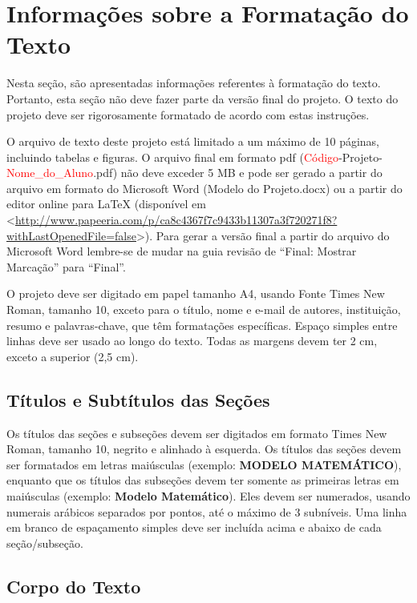 \documentclass[%
  report,%
  10pt,%
  a4paper,%
  fleqn,%
  oneside,%
  sumario = tradicional,%
  chapter = TITLE,%
  section = TITLE,%
]{abntex2}
\begin{document}
\section{Informações sobre a Formatação do Texto}\label{sec:infoform}

Nesta seção, são apresentadas informações referentes à formatação do texto. Portanto, esta seção não deve fazer parte da versão final do projeto. O texto do projeto deve ser rigorosamente formatado de acordo com estas instruções.

O arquivo de texto deste projeto está limitado a um máximo de 10 páginas, incluindo tabelas e figuras. O arquivo final em formato pdf (\textcolor{red}{Código}-Projeto-\textcolor{red}{Nome\_do\_Aluno}.pdf) não deve exceder 5 MB e pode ser gerado a partir do arquivo em formato do Microsoft Word (Modelo do Projeto.docx) ou a partir do editor online para LaTeX (disponível em <\url{http://www.papeeria.com/p/ca8c4367f7c9433b11307a3f720271f8?withLastOpenedFile=false}>). Para gerar a versão final a partir do arquivo do Microsoft Word lembre-se de mudar na guia revisão de ``Final: Mostrar Marcação'' para ``Final''.

O projeto deve ser digitado em papel tamanho A4, usando Fonte Times New Roman, tamanho 10, exceto para o título, nome e e-mail de autores, instituição, resumo e palavras-chave, que têm formatações específicas. Espaço simples entre linhas deve ser usado ao longo do texto. Todas as margens devem ter 2 cm, exceto a superior (2,5 cm).

\subsection{Títulos e Subtítulos das Seções}\label{ssec:tit}

Os títulos das seções e subseções devem ser digitados em formato Times New Roman, tamanho 10, negrito e alinhado à esquerda. Os títulos das seções devem ser formatados em letras maiúsculas (exemplo: \textbf{MODELO MATEMÁTICO}), enquanto que os títulos das subseções devem ter somente as primeiras letras em maiúsculas (exemplo: \textbf{Modelo Matemático}). Eles devem ser numerados, usando numerais arábicos separados por pontos, até o máximo de 3 subníveis. Uma linha em branco de espaçamento simples deve ser incluída acima e abaixo de cada seção/subseção.

\subsection{Corpo do Texto}\label{ssec:corpo}
\end{document}
